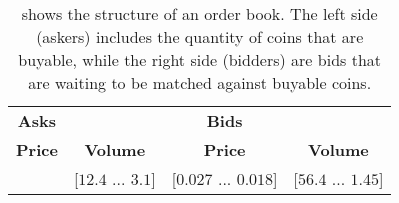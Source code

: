 \begin{table}[ht]
    \centering
    \begin{tabular}{c c| c c}
        \hline
         \textbf{Asks} & & \textbf{Bids} & \\
         \textbf{Price} & \textbf{Volume} & \textbf{Price} & \textbf{Volume}\\
         \hline
         [$0.028$ ... $0.14$] & [$12.4$ ... $3.1$] & [$0.027$ ... $0.018$] & [$56.4$ ... $1.45$]\\
         \hline
    \end{tabular}
    \caption[Definition - Order book]{shows the structure of an order book. The left side (askers) includes the quantity of coins that are buyable, while the right side (bidders) are bids that are waiting to be matched against buyable coins. }
    \label{tab:order_book}
\end{table}